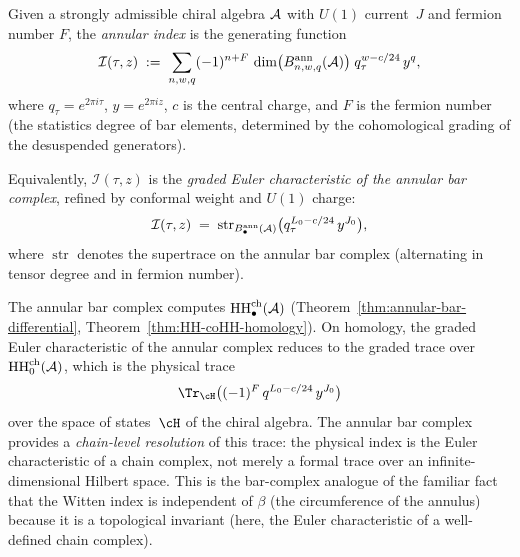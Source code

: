 \begin{definition}%
\label{def:annular-index}%
%
%
Given a strongly admissible chiral algebra $\mathcal{A}$ with
$U(1)$ current~$J$ and fermion number $F$, the
\emph{annular index} is the generating function
\begin{equation}\label{eq:annular-index-def}
\mathcal{I}(\tau,z)
\;:=\;
\sum_{n,w,q}
(-1)^{n+F}\,
\dim\bigl(
B^{\mathrm{ann}}_{n,w,q}(\mathcal{A})
\bigr)\;
q_\tau^{w-c/24}\,y^q,
\end{equation}
where $q_\tau = e^{2\pi i\tau}$, $y = e^{2\pi iz}$,
$c$ is the central charge, and $F$ is the fermion
number (the statistics degree of bar elements, determined
by the cohomological grading of the desuspended
generators).

Equivalently, $\mathcal{I}(\tau,z)$ is the
\emph{graded Euler characteristic of the annular bar
complex}, refined by conformal weight and $U(1)$ charge:
\begin{equation}\label{eq:annular-index-trace}
\mathcal{I}(\tau,z)
\;=\;
\operatorname{str}_{B^{\mathrm{ann}}_\bullet(\mathcal{A})}
\bigl(
q_\tau^{L_0 - c/24}\,y^{J_0}
\bigr),
\end{equation}
where $\operatorname{str}$ denotes the supertrace on
the annular bar complex (alternating in tensor degree and
in fermion number).
\end{definition}

\begin{remark}%
\label{rem:annular-physical-trace}%
The annular bar complex computes
$\operatorname{HH}_\bullet^{\mathrm{ch}}(\mathcal{A})$
(Theorem~\ref{thm:annular-bar-differential},
Theorem~\ref{thm:HH-coHH-homology}).
On homology, the graded Euler characteristic of the
annular complex reduces to the graded trace over
$\operatorname{HH}_0^{\mathrm{ch}}(\mathcal{A})$, which is the physical
trace
\[
\Tr_{\cH}
\bigl((-1)^F\,q^{L_0-c/24}\,y^{J_0}\bigr)
\]
over the space of states~$\cH$ of the chiral algebra.
The annular bar complex provides a \emph{chain-level
resolution} of this trace: the physical index is the
Euler characteristic of a chain complex, not merely a
formal trace over an infinite-dimensional Hilbert space.
This is the bar-complex analogue of the familiar fact
that the Witten index is independent of $\beta$ (the
circumference of the annulus) because it is a topological
invariant (here, the Euler characteristic of a
well-defined chain complex).
\end{remark}

